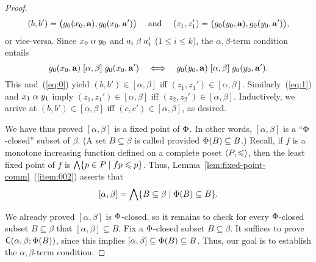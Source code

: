 \begin{proof}
    \[
    (b, b') = \bigl(g_0(x_0, \mathbf{a}), g_0(x_0, \mathbf{a}')\bigr)
    \quad \text{ and } \quad 
    (z_1,z_1')= \bigl(g_0(y_0, \mathbf{a}), g_0(y_0, \mathbf{a}')\bigr),
    \]
    or vice-versa.  Since $x_0 \mathrel{\alpha} y_0$ and 
    $a_i \mathrel{\beta} a_i'$ ($1\leq i\leq k$), the $\alpha,\beta$-term condition
    entails
    \[
    g_0(x_0, \mathbf{a}) \mathrel{[\alpha, \beta]} g_0(x_0, \mathbf{a}')
    \quad \Longleftrightarrow \quad 
    g_0(y_0, \mathbf{a}) \mathrel{[\alpha, \beta]} g_0(y_0, \mathbf{a}').
    \]
    This and~(\ref{eq:0}) yield
    $(b,b')\in [\alpha, \beta]$ iff
    $(z_1,z_1')\in [\alpha, \beta]$.
    Similarly~(\ref{eq:1}) and $x_1 \mathrel{\alpha} y_1$ imply
    $(z_1,z_1')\in [\alpha, \beta]$ iff
    $(z_2,z_2')\in [\alpha, \beta]$.  Inductively, we arrive at 
    $(b,b')\in [\alpha, \beta]$ iff $(c,c')\in [\alpha, \beta]$, as desired.

    We have thus proved $[\alpha, \beta]$ is a fixed point of $\Phi$.
    In other words, 
    $[\alpha, \beta]$ is a ``$\Phi$-closed'' subset of $\beta$.
    (A set $B\subseteq \beta$ is called  provided
    $\Phi(B) \subseteq B$.)
    Recall, if $f$ is a monotone increasing function defined on a
    complete poset $\langle P, \leqslant\rangle$, then the least fixed point of $f$
    is $\bigwedge \{ p\in P \mid f p \leqslant p\}$. %
    Thus,
    Lemma~\ref{lem:fixed-point-comm}~(\ref{item:002}) asserts that
    \[
            [\alpha, \beta] =\bigwedge \{ B \subseteq \beta \mid \Phi(B) \subseteq B\}.
    \]

    We already proved $[\alpha, \beta]$ is
    $\Phi$-closed, so it remains to check for every $\Phi$-closed subset
    $B\subseteq \beta$ that $[\alpha, \beta] \subseteq B$.
    Fix a $\Phi$-closed subset $B\subseteq \beta$. %
    It suffices to prove $\mathsf{C}(\alpha, \beta; \Phi(B))$, since this implies 
    $[\alpha, \beta] \subseteq \Phi(B) \subseteq B$.
    Thus, our goal is to establish the $\alpha, \beta$-term condition.


\end{proof}
